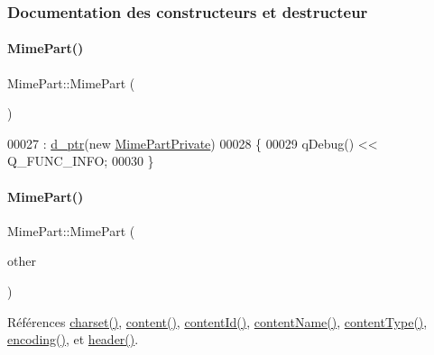 \subsubsection{Documentation des constructeurs et destructeur}
\mbox{\label{class_simple_mail_1_1_mime_part_a32106b6567131dd5f4e8d26359a85249}} 
\paragraph{\texorpdfstring{Mime\+Part()}{MimePart()}\hspace{0.1cm}{\footnotesize\ttfamily [1/3]}}
{\footnotesize\ttfamily Mime\+Part\+::\+Mime\+Part (\begin{DoxyParamCaption}{ }\end{DoxyParamCaption})}


\begin{DoxyCode}
00027                    : \hyperlink{class_simple_mail_1_1_mime_part_a6adc00256ce96a9282f2ec0224625b0b}{d\_ptr}(\textcolor{keyword}{new} \hyperlink{class_simple_mail_1_1_mime_part_private}{MimePartPrivate})
00028 \{
00029     qDebug() << Q\_FUNC\_INFO;
00030 \}
\end{DoxyCode}
\mbox{\label{class_simple_mail_1_1_mime_part_a22b25ea7c1bb06d1b73f4c43103bfa1e}} 
\paragraph{\texorpdfstring{Mime\+Part()}{MimePart()}\hspace{0.1cm}{\footnotesize\ttfamily [2/3]}}
{\footnotesize\ttfamily Mime\+Part\+::\+Mime\+Part (\begin{DoxyParamCaption}\item[{const \hyperlink{class_simple_mail_1_1_mime_part}{Mime\+Part} \&}]{other }\end{DoxyParamCaption})}



Références \hyperlink{class_simple_mail_1_1_mime_part_a419b2efe442eb59002ae14c8ab18f94e}{charset()}, \hyperlink{class_simple_mail_1_1_mime_part_a22fd1bc02bce6c9655d879fd71620bf5}{content()}, \hyperlink{class_simple_mail_1_1_mime_part_a95fbca14bef123a2b65227f4d26622a5}{content\+Id()}, \hyperlink{class_simple_mail_1_1_mime_part_ad16adf3afc9873b4b0636cd3264e2f3e}{content\+Name()}, \hyperlink{class_simple_mail_1_1_mime_part_a3952c9506cc3baf478ecf3a8c204297a}{content\+Type()}, \hyperlink{class_simple_mail_1_1_mime_part_a7e7b2d8b6f32175fbc9d62e5b23ca720}{encoding()}, et \hyperlink{class_simple_mail_1_1_mime_part_a87f3646cf7e63664d3d92d087afd76ae}{header()}.


